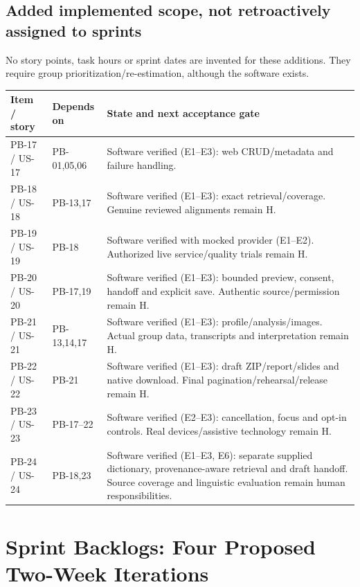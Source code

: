 \documentclass[11pt,a4paper]{article}
\begin{document}
\subsection{Added implemented scope, not retroactively assigned to sprints}
No story points, task hours or sprint dates are invented for these additions.
They require group prioritization/re-estimation, although the software exists.
\begin{longtable}{L{1.8cm}L{2cm}L{10.5cm}}
\toprule\textbf{Item / story} & \textbf{Depends on} & \textbf{State and next acceptance gate}\\\midrule\endhead
PB-17 / US-17 & PB-01,05,06 & Software verified (E1--E3): web CRUD/metadata and failure handling.\\
PB-18 / US-18 & PB-13,17 & Software verified (E1--E3): exact retrieval/coverage. Genuine reviewed alignments remain H.\\
PB-19 / US-19 & PB-18 & Software verified with mocked provider (E1--E2). Authorized live service/quality trials remain H.\\
PB-20 / US-20 & PB-17,19 & Software verified (E1--E3): bounded preview, consent, handoff and explicit save. Authentic source/permission remain H.\\
PB-21 / US-21 & PB-13,14,17 & Software verified (E1--E3): profile/analysis/images. Actual group data, transcripts and interpretation remain H.\\
PB-22 / US-22 & PB-21 & Software verified (E1--E3): draft ZIP/report/slides and native download. Final pagination/rehearsal/release remain H.\\
PB-23 / US-23 & PB-17--22 & Software verified (E2--E3): cancellation, focus and opt-in controls. Real devices/assistive technology remain H.\\
PB-24 / US-24 & PB-18,23 & Software verified (E1--E3, E6): separate supplied dictionary, provenance-aware retrieval and draft handoff. Source coverage and linguistic evaluation remain human responsibilities.\\
\bottomrule\end{longtable}

\section{Sprint Backlogs: Four Proposed Two-Week Iterations}
\end{document}
